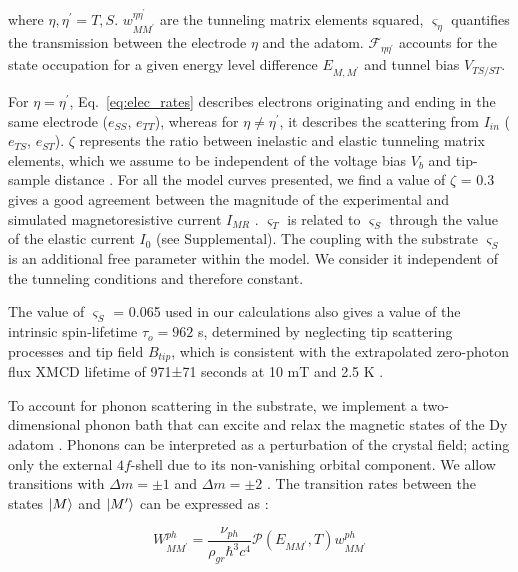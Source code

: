 \documentclass[
reprint,amsmath,amssymb,aps]{revtex4-2}
\begin{document}
where $\eta,\eta^{\prime}=T,S$. $w_{MM^{\prime}}^{\eta \eta^{\prime}} $ are the tunneling matrix elements squared, $\varsigma_{\eta}$ quantifies the transmission between the electrode $\eta$ and the adatom. $\mathcal{F}_{\eta\eta^{\prime}}$ accounts for the state occupation for a given energy level difference $ E_{M,M^{\prime}}$ and tunnel bias $V_{TS/ST}$.

For $\eta=\eta^{\prime}$, Eq.~\ref{eq:elec_rates} describes electrons originating and ending in the same electrode ($e_{SS}$, $e_{TT}$), whereas for $\eta \neq \eta^{\prime}$, it describes the scattering from $I_{in}$ ($e_{TS}$, $e_{ST}$). $\zeta$ represents the ratio between inelastic and elastic tunneling matrix elements, which we assume to be independent of the voltage bias $V_b$ and tip-sample distance \cite{fern2009,paul_ControlMillisecondSpin_2017,lorenteEfficientSpinTransitions2009,nussinovNoiseSpectroscopySingle2003}. For all the model curves presented, we find a value of $\zeta$ = 0.3 gives a good agreement between the magnitude of the experimental and simulated magnetoresistive current $I_{MR}$ \cite{delgadoSpinTransferTorqueSingle2010,delgado2010}.
$\varsigma_T$ is related to $\varsigma_S$ through the value of the elastic current $I_0$ (see Supplemental). The coupling with the substrate $\varsigma_S$ is an additional free parameter within the model. We consider it independent of the tunneling conditions and therefore constant.

The value of $\varsigma_S$ = 0.065 used in our calculations also gives a value of the intrinsic spin-lifetime $\tau_o=962$ s, determined by neglecting tip scattering processes and tip field $B_{tip}$, which is consistent with the extrapolated zero-photon flux XMCD lifetime of 971±71 seconds at 10 mT and 2.5 K \citep{baltic2016}.

To account for phonon scattering in the substrate, we implement a two-dimensional phonon bath that can excite and relax the magnetic states of the Dy adatom \cite{cervetti2016,politi_tunneling_1995}. Phonons can be interpreted as a perturbation of the crystal field; acting only the external $4f$-shell due to its non-vanishing orbital component. We allow transitions with $\Delta m = \pm 1$ and $\Delta m = \pm 2$ \citep{cervetti2016}. The transition rates between the states $\ket{M}$ and $\ket{M^{\prime}}$ can be expressed as \cite{politi_tunneling_1995, cervetti2016,Leuenberger2000}:

\begin{equation}
    \label{eq:phonon_rates}
    W_{MM^{\prime}}^{ph}=\dfrac{\nu_{ph}}{\rho_{gr} \hbar^3 c^4} \mathcal{P} \left( E_{MM^{\prime}}, T \right) w^{ph}_{MM^{\prime}}
\end{equation}
\end{document}
